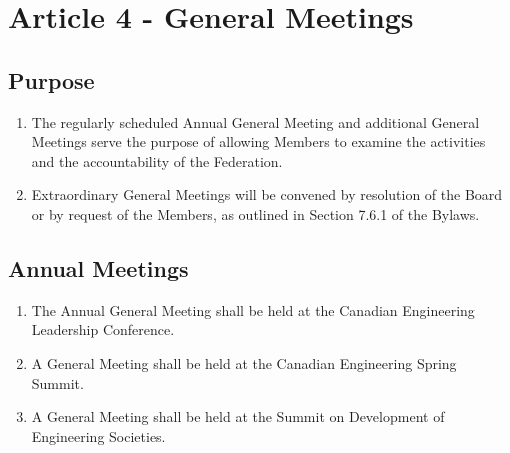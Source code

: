 \section{Article 4 - General Meetings}
\label{article-4-general-meetings}

\subsection{Purpose}
\label{purpose-meetings}

\begin{enumerate}
 \item The regularly scheduled Annual General Meeting and additional General Meetings serve the purpose of allowing Members to examine the activities and the accountability of the Federation.
 \item Extraordinary General Meetings will be convened by resolution of the Board or by request of the Members, as outlined in Section 7.6.1 of the Bylaws.
\end{enumerate}

\subsection{Annual Meetings}
\label{annual-meetings}

\begin{enumerate}
 \item The Annual General Meeting shall be held at the Canadian Engineering Leadership Conference.
 \item A General Meeting shall be held at the Canadian Engineering Spring Summit.
 \item A General Meeting shall be held at the Summit on Development of Engineering Societies.
\end{enumerate}
